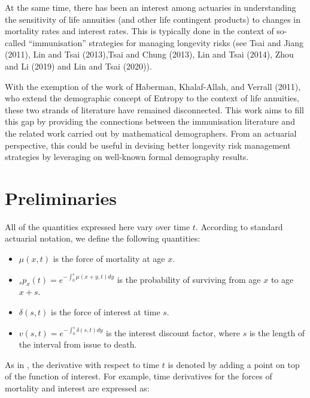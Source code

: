 \documentclass[12pt]{article}
\begin{document}
At the same time, there has been an interest among actuaries in understanding the sensitivity of life annuities (and other life contingent products) to changes in mortality rates and interest rates. This is typically done in the context of so-called ``immunisation'' strategies for managing longevity risks (see Tsai and Jiang (2011), Lin and Tsai (2013),Tsai and Chung (2013), Lin and Tsai (2014), Zhou and Li (2019) and Lin and Tsai (2020)).

With the exemption of the work of Haberman, Khalaf-Allah, and Verrall (2011), who extend the demographic concept of Entropy to the context of life annuities, these two strands of literature have remained disconnected. This work aims to fill this gap by providing the connections between the immunisation literature and the related work carried out by mathematical demographers. From an actuarial perspective, this could be useful in devising better longevity risk management strategies by leveraging on well-known formal demography results.

\section{Preliminaries}\label{preliminaries}

All of the quantities expressed here vary over time $t$. According to standard actuarial notation, we define the following quantities:

\begin{itemize}

\item
\(\mu(x,t)\) is the force of mortality at age \(x\).

\item
$_sp_x(t)=e^{-\int_{0}^{s}\mu(x+y,t)dy}$ is the probability of surviving from age \(x\) to age \(x+s\).


\item
\(\delta(s,t)\) is the force of interest at time $s$.

\item 

${v}(s,t)=e^{-\int_{0}^{s}\delta(s,t)dy}$ is the interest discount factor, where $s$ is the length of the interval from issue to death.

\end{itemize}

As in \citet{Vaupel2003}, the derivative with respect to time $t$ is denoted by adding a point on top of the function of interest. For example, time derivatives for the forces of mortality and interest are expressed as:
\end{document}
